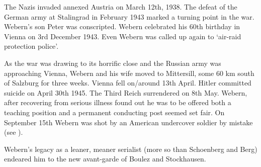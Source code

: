 The Nazis invaded annexed Austria on March 12th, 1938. The defeat of the German army at Stalingrad in February 1943 marked a turning point in the war. Webern's son Peter was conscripted. Webern celebrated his 60th birthday in Vienna on 3rd December 1943. Even Webern was called up again to `air-raid protection police'.  

As the war was drawing to its horrific close and the Russian army was approaching Vienna, Webern and his wife moved to Mittersill, some 60 km south of Salzburg for three weeks. Vienna fell on/around 13th April. Hitler committed suicide on April 30th 1945. The Third Reich surrendered on 8th May. Webern, after recovering from serious illness found out he was to be offered both a teaching position and a permanent conducting post seemed set fair. On September 15th Webern was shot by an American undercover soldier by mistake (see \citep[p216]{hayes1995anton}). 

Webern's legacy as a leaner, meaner serialist (more so than Schoenberg and Berg) endeared him to the new avant-garde of Boulez and Stockhausen. 

